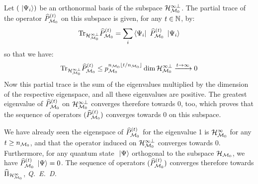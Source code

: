  Let $(\ \left|{\Psi_i}\right\rangle)$ be an orthonormal basis of the subspace $\mathcal H_{\mathcal M_0}^{\infty \perp}$. The partial trace of the operator $\widehat{P}_{\mathcal M_0}^{(t)}$ on this subspace is given, for any $t \in \mathbb{N}$, by:
\begin{equation*}
\mathrm{Tr}_{\mathcal H_{\mathcal M_0}^{\infty \perp}} \widehat{P}_{\mathcal M_0}^{(t)} = \sum_i \left\langle{\Psi_i}\right|\  \widehat{P}_{\mathcal M_0}^{(t)} \ \left|{\Psi_i}\right\rangle
\end{equation*}
so that we have:
\begin{equation*}
\mathrm{Tr}_{\mathcal H_{\mathcal M_0}^{\infty \perp}} \widehat{P}_{\mathcal M_0}^{(t)} \leq p_{\mathcal M_0}^{n_{\mathcal M_0} \lfloor t / n_{\mathcal M_0}  \rfloor} \dim \mathcal H_{\mathcal M_0}^{\infty \perp} \xrightarrow{t \to \infty} 0
\end{equation*}
Now this partial trace is the sum of the eigenvalues multiplied by the dimension of the respective eigenspace, and all these eigenvalues are positive. The greatest eigenvalue of $\widehat{P}_{\mathcal M_0}^{(t)}$ on $\mathcal H_{\mathcal M_0}^{\infty \perp}$ converges therefore towards 0, too, which proves that the sequence of operators $(\widehat{P}_{\mathcal M_0}^{(t)})$ converges towards 0 on this subspace.

 We have already seen the eigenspace of $\widehat{P}_{\mathcal M_0}^{(t)}$ for the eigenvalue 1 is $\mathcal H_{\mathcal M_0}^\infty$ for any $t \geq n_{\mathcal M_0}$, and that the operator induced on $\mathcal H_{\mathcal M_0}^{\infty \perp}$ converges towards 0. Furthermore, for any quantum state $\ \left|{\Psi}\right\rangle$ orthogonal to the subspace $\mathcal H_{\mathcal M_0}$, we have $\widehat{P}_{\mathcal M_0}^{(t)} \ \left|{\Psi}\right\rangle = 0$. The sequence of operators $(\widehat{P}_{\mathcal M_0}^{(t)})$ converges therefore towards $\widehat{\Pi}_{\mathcal H_{\mathcal M_0}^\infty}$, \textit{Q.~E.~D.}

